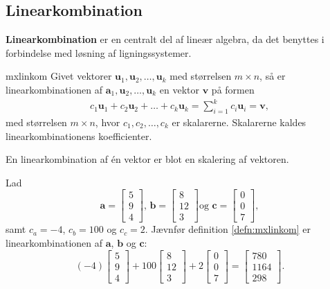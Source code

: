 \subsection{Linearkombination}
%
\textbf{Linearkombination} er en centralt del af lineær algebra, da det benyttes i forbindelse med løsning af ligningssystemer. 
%
\begin{defn}{}{mxlinkom}
Givet vektorer $\mathbf{u}_1, \mathbf{u}_2, \ldots, \mathbf{u}_k$ med størrelsen $m \times n$, så er linearkombinationen af $\mathbf{a}_1, \mathbf{u}_2, \ldots, \mathbf{u}_k$ en vektor $\mathbf{v}$ på formen 
%
\begin{align*}
c_1\mathbf{u}_1+c_2\mathbf{u}_2+\ldots+c_k\mathbf{u}_k=\sum\limits_{i=1}^k c_i\mathbf{u}_i=\mathbf{v},
\end{align*}
%
med størrelsen $m \times n$, hvor $c_1, c_2, \ldots, c_k$ er skalarerne.
Skalarerne kaldes linearkombinationens koefficienter.
\end{defn}
%
%
\noindent 
%
En linearkombination af én vektor er blot en skalering af vektoren.
\\
%
%
\begin{eks}
Lad 
$$
\textbf{a}=
\begin{bmatrix}
5 \\
9 \\
4
\end{bmatrix}
\text{, }
\textbf{b}=
\begin{bmatrix}
8  \\
12 \\ 
3
\end{bmatrix}
\text{og }
\textbf{c}=
\begin{bmatrix}
0 \\
0 \\
7
\end{bmatrix},
$$
samt $c_a=-4$, $c_b=100$ og $c_c=2$. 
Jævnfør definition \ref{defn:mxlinkom} er linearkombinationen af $\textbf{a}$, $\textbf{b}$ og $\textbf{c}$:
$$
(-4)
\begin{bmatrix}
5 \\ 
9 \\ 
4
\end{bmatrix}
+
100
\begin{bmatrix}
8 \\
12 \\ 
3
\end{bmatrix}
+
2
\begin{bmatrix}
0 \\
0 \\ 
7
\end{bmatrix}
=
\begin{bmatrix}
780 \\
1164 \\ 
298
\end{bmatrix}
\text{.}
$$
\end{eks}
